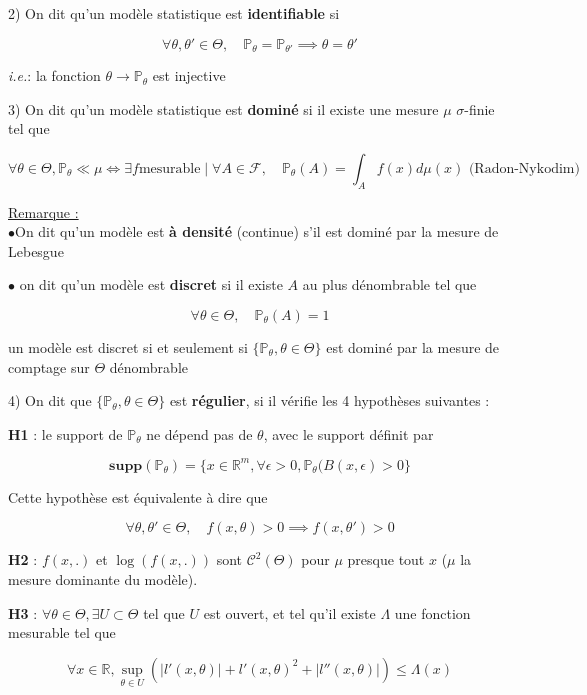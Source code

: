 \documentclass[12pt]{article}
\newcommand{\petitespace}{\vspace{0.5cm}}
\newcommand{\shift}{\hspace{2em}}
\newcommand{\bb}[1]{\mathbb{#1}} %
\newcommand{\R}{\bb{R}} %
\renewcommand{\P}{\bb{P}}%
\newcommand{\ie}{\textit{i.e.}}
\newcommand{\Rq}{\underline{Remarque :} \\}
\renewcommand{\cal}{\mathcal}
\newcommand{\Sup}[1]{\sup\limits_{#1}}%
\newcommand{\modelstat}{\{ \P_\theta, \theta \in \Theta\}}
\newcommand{\1}{\bb{1}} %
\begin{document}
2) On dit qu'un modèle statistique est \textbf{identifiable} si 

$$ \forall \theta, \theta' \in \Theta,\quad  \P_\theta = \P_{\theta'} \implies \theta=\theta'$$

\ie: la fonction $\theta \to \P_\theta$ est injective \petitespace

3) On dit qu'un modèle statistique est \textbf{dominé} si il existe une mesure $\mu$  $\sigma$-finie  tel que 

$$\forall \theta\in \Theta, \P_\theta \ll \mu \iff \exists f \text{mesurable} \mid \forall A \in \cal F,\quad \P_\theta(A) = \int_Af(x)d\mu(x)\text{ (Radon-Nykodim)}$$

\Rq

$\bullet$On dit qu'un modèle est \textbf{à densité} (continue) s'il est dominé par la mesure de Lebesgue\petitespace

$\bullet$ on dit qu'un modèle est \textbf{discret} si il existe $A$ au plus dénombrable tel que

$$\forall \theta \in \Theta, \quad \P_\theta(A)=1$$

un modèle est discret si et seulement si $\modelstat$ est dominé par la mesure de comptage sur $\Theta$ dénombrable\petitespace

4) On dit que $\modelstat$ est \textbf{régulier}, si il vérifie les 4 hypothèses suivantes :\vspace{1.5em}

\hspace{2em} \textbf{H1} : le support de $\P_\theta$ ne dépend pas de $\theta$, avec le support définit par 

$$\textbf{supp}(\P_\theta)= \{x \in \R^m, \forall \epsilon>0, \P_\theta(B(x,\epsilon) >0\} $$

\shift \shift Cette hypothèse est équivalente à dire que 

$$\forall \theta, \theta' \in \Theta,\quad f(x,\theta)>0 \implies f(x, \theta')>0$$
\petitespace

\hspace{2em} \textbf{H2} : $f(x,.)$ et $\log(f(x,.))$ sont $\cal C^2(\Theta)$ pour $\mu$ presque tout $x$ ($\mu$ la mesure dominante du modèle). \petitespace

\hspace{2em} \textbf{H3} : $\forall \theta \in \Theta, \exists U \subset \Theta$ tel que $U$ est ouvert, et tel qu'il existe $\Lambda$ une fonction mesurable tel que 

$$\forall x \in \R, \Sup{\theta \in U}(\lvert l'(x,\theta)\rvert + l'(x,\theta)^2+\lvert l''(x,\theta)\rvert) \le \Lambda(x) $$
\end{document}
